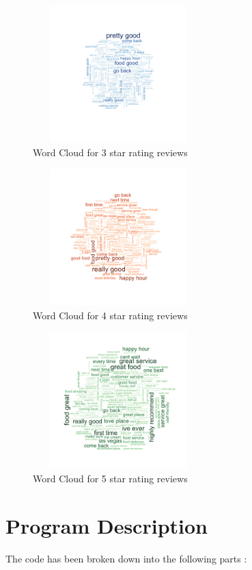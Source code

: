 \documentclass[paper=a4, fontsize=11pt]{scrartcl} %
\numberwithin{equation}{section} %
\numberwithin{figure}{section} %
\numberwithin{table}{section} %
\begin{document}
\begin{figure}[!htb]
\centering
\includegraphics[width=250px, height = 200px]{3_star_wordcloud_500k.png}
\caption{Word Cloud for 3 star rating reviews}
\label{wc3}
\end{figure} 

\begin{figure}[!htb]
\centering
\includegraphics[width=250px, height = 200px]{4_star_wordcloud_500k.png}
\caption{Word Cloud for 4 star rating reviews}
\label{wc4}
\end{figure} 

\begin{figure}[!htb]
\centering
\includegraphics[width=250px, height = 200px]{5_star_wordcloud_500k.png}
\caption{Word Cloud for 5 star rating reviews}
\label{wc5}
\end{figure} 


\section{Program Description}
The code has been broken down into the following parts : 
\end{document}
